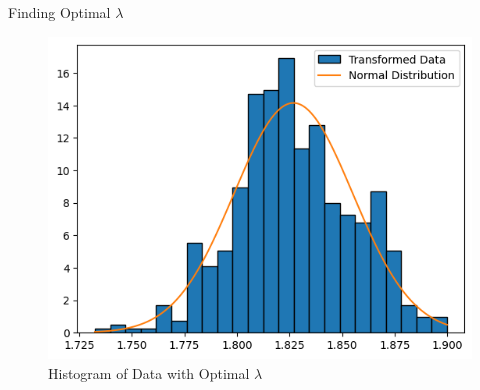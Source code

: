 \begin{frame}{Finding Optimal $\lambda$}

\begin{figure}
  \centering
  \includegraphics[width=0.8\linewidth]{Project1/Report/images/optimal-hist.png}
  \caption{Histogram of Data with Optimal $\lambda$}
\end{figure}
  
\end{frame}
